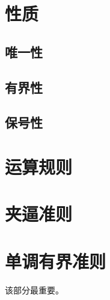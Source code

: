 \documentclass[UTF8]{ctexart}
\begin{document}
\section{性质}
\subsection{唯一性}
\subsection{有界性}
\subsection{保号性}
\section{运算规则}
\section{夹逼准则}
\section{单调有界准则}

该部分最重要。
\end{document}
